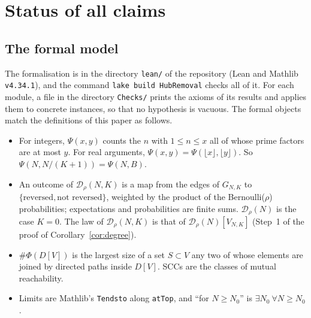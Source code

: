 \documentclass[11pt]{amsart}
\theoremstyle{definition}
\newcommand{\cD}{\mathcal{D}}
\begin{document}
\section{Status of all claims}\label{app:status}

\subsection*{The formal model}
The formalisation is in the directory \texttt{lean/} of the repository (Lean and Mathlib \texttt{v4.34.1}), and the command \texttt{lake build HubRemoval} checks all of it. For each module, a file in the directory \texttt{Checks/} prints the axioms of its results and applies them to concrete instances, so that no hypothesis is vacuous. The formal objects match the definitions of this paper as follows.
\begin{itemize}
\item For integers, $\Psi(x,y)$ counts the $n$ with $1\le n\le x$ all of whose prime factors are at most $y$. For real arguments, $\Psi(x,y)=\Psi(\lfloor x\rfloor,\lfloor y\rfloor)$. So $\Psi(N,N/(K+1))=\Psi(N,B)$.
\item An outcome of $\cD_\rho(N,K)$ is a map from the edges of $G_{N,K}$ to $\{\text{reversed},\text{not reversed}\}$, weighted by the product of the Bernoulli($\rho$) probabilities; expectations and probabilities are finite sums. $\cD_\rho(N)$ is the case $K=0$. The law of $\cD_\rho(N,K)$ is that of $\cD_\rho(N)[V_{N,K}]$ (Step~1 of the proof of Corollary~\ref{cor:degree}).
\item $\#\Phi(D[V])$ is the largest size of a set $S\subset V$ any two of whose elements are joined by directed paths inside $D[V]$. SCCs are the classes of mutual reachability.
\item Limits are Mathlib's \texttt{Tendsto} along \texttt{atTop}, and ``for $N\ge N_0$'' is $\exists N_0\ \forall N\ge N_0$.
\end{itemize}
\end{document}
